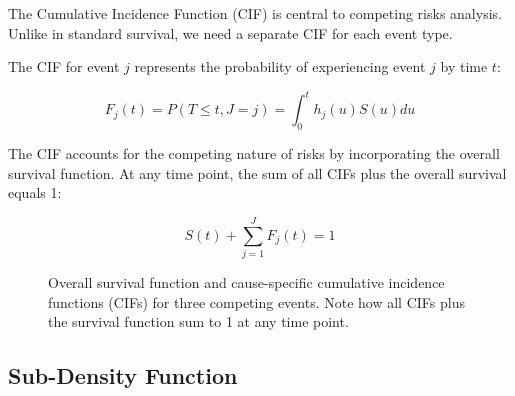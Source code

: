 The Cumulative Incidence Function (CIF) is central to competing risks analysis. Unlike in standard survival, we need a separate CIF for each event type.

\begin{definitionbox}[title=Cumulative Incidence Function]
The CIF for event $j$ represents the probability of experiencing event $j$ by time $t$:

\begin{equation}
F_j(t) = P(T \leq t, J = j) = \int_0^t h_j(u) S(u) du
\end{equation}
\end{definitionbox}

The CIF accounts for the competing nature of risks by incorporating the overall survival function. At any time point, the sum of all CIFs plus the overall survival equals 1:

\begin{equation}
S(t) + \sum_{j=1}^{J} F_j(t) = 1
\end{equation}

\begin{figure}[htbp]
    \centering
    \caption{Overall survival function and cause-specific cumulative incidence functions (CIFs) for three competing events. Note how all CIFs plus the survival function sum to 1 at any time point.}
    \label{fig:survival-cif}
\end{figure}

\subsection{Sub-Density Function}

